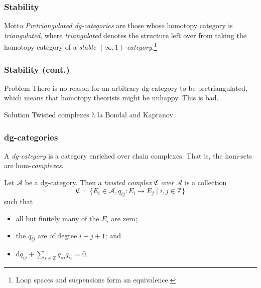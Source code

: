 \documentclass{beamer}
\begin{document}
        \begin{frame}\frametitle{Stability}
            \begin{block}{Motto}
                \emph{Pretriangulated dg-categories} are those whose homotopy category is \emph{triangulated}, where \emph{triangulated} denotes the structure left over from taking the homotopy category of a \emph{stable $(\infty,1)$-category}.\footnote{Loop spaces and suspensions form an equivalence.}
            \end{block}
        \end{frame}

        \begin{frame}\frametitle{Stability (cont.)}
            \begin{alertblock}{Problem}
                There is no reason for an arbitrary dg-category to be pretriangulated, which means that homotopy theorists might be unhappy.
                This is bad.
            \end{alertblock}

            \pause

            \begin{block}{Solution}
                Twisted complexes à la Bondal and Kapranov.
            \end{block}
        \end{frame}

        \begin{frame}\frametitle{dg-categories}
            \begin{definition}
                A \emph{dg-category} is a category enriched over chain complexes.
                That is, the hom-sets are hom-\emph{complexes}.
            \end{definition}

            \pause

            \begin{definition}
                Let $\mathcal{A}$ be a dg-category.
                Then a \emph{twisted complex $\mathfrak{C}$ over $\mathcal{A}$} is a collection
                \begin{equation*}
                    \mathfrak{C} = \{E_i\in\mathcal{A},q_{ij}\colon E_i\to E_j\mid i,j\in\mathbb{Z}\}
                \end{equation*}
                such that
                \begin{itemize}
                    \item all but finitely many of the $E_i$ are zero;
                    \item the $q_{ij}$ are of degree $i-j+1$; and
                    \item $\mathrm{d}q_{ij}+\sum_{s\in\mathbb{Z}} q_{sj}q_{is}=0$.
                \end{itemize}
            \end{definition}
        \end{frame}
\end{document}
